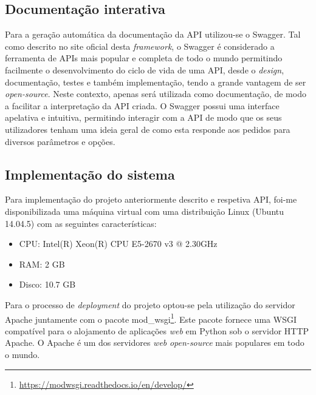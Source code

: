 \subsection{Documentação interativa}


Para a geração automática da documentação da \ac{API} utilizou-se o Swagger. Tal como descrito no site oficial desta \textit{framework}\cite{SmartBearSoftware2017}, o Swagger é considerado a ferramenta de APIs mais popular e completa de todo o mundo permitindo facilmente o desenvolvimento do ciclo de vida de uma \ac{API}, desde o \textit{design}, documentação, testes e também implementação, tendo a grande vantagem de ser \textit{open-source}. Neste contexto, apenas será utilizada como documentação, de modo a facilitar a interpretação da \ac{API} criada. O Swagger possui uma interface apelativa e intuitiva, permitindo interagir com a \ac{API} de modo que os seus utilizadores tenham uma ideia geral de como esta responde aos pedidos para diversos parâmetros e opções. 





\subsection{Implementação do sistema}

Para implementação do projeto anteriormente descrito e respetiva API, foi-me disponibilizada uma máquina virtual com uma distribuição Linux (Ubuntu 14.04.5) com as seguintes características: 

\begin{itemize}
	\item \ac{CPU}: Intel(R) Xeon(R) CPU E5-2670 v3 @ 2.30GHz
	\item \ac{RAM}: 2 GB
	\item Disco: 10.7 GB
\end{itemize}


Para o processo de \textit{deployment} do projeto optou-se pela utilização do servidor Apache juntamente com o pacote mod\_wsgi\footnote{\url{https://modwsgi.readthedocs.io/en/develop/}}. 
Este pacote fornece uma \ac{WSGI} compatível para o alojamento de aplicações \textit{web} em Python sob o servidor \ac{HTTP} Apache. O Apache é um dos servidores \textit{web} \textit{open-source} mais  populares em todo o mundo\cite{TheApacheSoftwareFoundation2016}.







